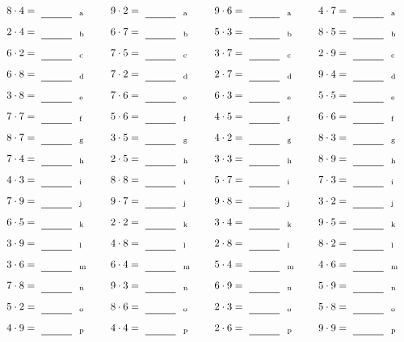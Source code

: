 \documentclass
[
  draft    = true,
  fontsize = 11pt,
  parskip  = half-
]
{scrartcl}
\begin{document}
\par\vfill\par
\begin{align*}
    \pline{8\cdot4}&=\rline{a}
  & \pline{9\cdot2}&=\rline{a}
  & \pline{9\cdot6}&=\rline{a}
  & \pline{4\cdot7}&=\rline{a} \\[1ex]
    \pline{2\cdot4}&=\rline{b}
  & \pline{6\cdot7}&=\rline{b}
  & \pline{5\cdot3}&=\rline{b}
  & \pline{8\cdot5}&=\rline{b} \\[1ex]
    \pline{6\cdot2}&=\rline{c}
  & \pline{7\cdot5}&=\rline{c}
  & \pline{3\cdot7}&=\rline{c}
  & \pline{2\cdot9}&=\rline{c} \\[1ex]
    \pline{6\cdot8}&=\rline{d}
  & \pline{7\cdot2}&=\rline{d}
  & \pline{2\cdot7}&=\rline{d}
  & \pline{9\cdot4}&=\rline{d} \\[1ex]
    \pline{3\cdot8}&=\rline{e}
  & \pline{7\cdot6}&=\rline{e}
  & \pline{6\cdot3}&=\rline{e}
  & \pline{5\cdot5}&=\rline{e} \\[1ex]
    \pline{7\cdot7}&=\rline{f}
  & \pline{5\cdot6}&=\rline{f}
  & \pline{4\cdot5}&=\rline{f}
  & \pline{6\cdot6}&=\rline{f} \\[1ex]
    \pline{8\cdot7}&=\rline{g}
  & \pline{3\cdot5}&=\rline{g}
  & \pline{4\cdot2}&=\rline{g}
  & \pline{8\cdot3}&=\rline{g} \\[1ex]
    \pline{7\cdot4}&=\rline{h}
  & \pline{2\cdot5}&=\rline{h}
  & \pline{3\cdot3}&=\rline{h}
  & \pline{8\cdot9}&=\rline{h} \\[1ex]
    \pline{4\cdot3}&=\rline{i}
  & \pline{8\cdot8}&=\rline{i}
  & \pline{5\cdot7}&=\rline{i}
  & \pline{7\cdot3}&=\rline{i} \\[1ex]
    \pline{7\cdot9}&=\rline{j}
  & \pline{9\cdot7}&=\rline{j}
  & \pline{9\cdot8}&=\rline{j}
  & \pline{3\cdot2}&=\rline{j} \\[1ex]
    \pline{6\cdot5}&=\rline{k}
  & \pline{2\cdot2}&=\rline{k}
  & \pline{3\cdot4}&=\rline{k}
  & \pline{9\cdot5}&=\rline{k} \\[1ex]
    \pline{3\cdot9}&=\rline{l}
  & \pline{4\cdot8}&=\rline{l}
  & \pline{2\cdot8}&=\rline{l}
  & \pline{8\cdot2}&=\rline{l} \\[1ex]
    \pline{3\cdot6}&=\rline{m}
  & \pline{6\cdot4}&=\rline{m}
  & \pline{5\cdot4}&=\rline{m}
  & \pline{4\cdot6}&=\rline{m} \\[1ex]
    \pline{7\cdot8}&=\rline{n}
  & \pline{9\cdot3}&=\rline{n}
  & \pline{6\cdot9}&=\rline{n}
  & \pline{5\cdot9}&=\rline{n} \\[1ex]
    \pline{5\cdot2}&=\rline{o}
  & \pline{8\cdot6}&=\rline{o}
  & \pline{2\cdot3}&=\rline{o}
  & \pline{5\cdot8}&=\rline{o} \\[1ex]
    \pline{4\cdot9}&=\rline{p}
  & \pline{4\cdot4}&=\rline{p}
  & \pline{2\cdot6}&=\rline{p}
  & \pline{9\cdot9}&=\rline{p}
\end{align*}
\end{document}
